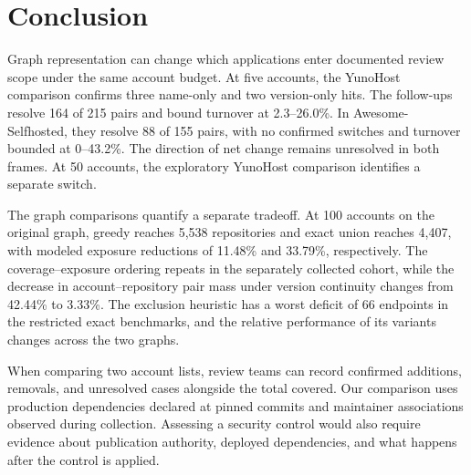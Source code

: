 \section{Conclusion}
\label{sec:conclusion}
Graph representation can change which applications enter documented review scope under the same account budget. At five accounts, the YunoHost comparison confirms three name-only and two version-only hits. The follow-ups resolve 164 of 215 pairs and bound turnover at 2.3--26.0\%. In Awesome-Selfhosted, they resolve 88 of 155 pairs, with no confirmed switches and turnover bounded at 0--43.2\%. The direction of net change remains unresolved in both frames. At 50 accounts, the exploratory YunoHost comparison identifies a separate switch.

The graph comparisons quantify a separate tradeoff. At 100 accounts on the original graph, greedy reaches 5,538 repositories and exact union reaches 4,407, with modeled exposure reductions of 11.48\% and 33.79\%, respectively. The coverage--exposure ordering repeats in the separately collected cohort, while the decrease in account--repository pair mass under version continuity changes from 42.44\% to 3.33\%. The exclusion heuristic has a worst deficit of 66 endpoints in the restricted exact benchmarks, and the relative performance of its variants changes across the two graphs.

When comparing two account lists, review teams can record confirmed additions, removals, and unresolved cases alongside the total covered. Our comparison uses production dependencies declared at pinned commits and maintainer associations observed during collection. Assessing a security control would also require evidence about publication authority, deployed dependencies, and what happens after the control is applied.
